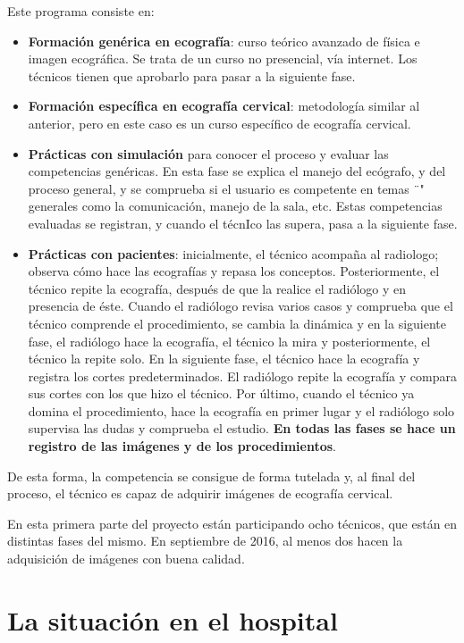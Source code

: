 \documentclass[]{article}
\providecommand{\tightlist}{%
  \setlength{\itemsep}{0pt}\setlength{\parskip}{0pt}}
\begin{document}
Este programa consiste en:

\begin{itemize}
\tightlist
\item
  \textbf{Formación genérica en ecografía}: curso teórico avanzado de física e imagen ecográfica. Se trata de un curso no presencial, vía internet. Los técnicos tienen que aprobarlo para pasar a la siguiente fase.
\item
  \textbf{Formación específica en ecografía cervical}: metodología similar al anterior, pero en este caso es un curso específico de ecografía cervical.
\item
  \textbf{Prácticas con simulación} para conocer el proceso y evaluar las competencias genéricas. En esta fase se explica el manejo del ecógrafo, y del proceso general, y se comprueba si el usuario es competente en temas ¨" generales como la comunicación, manejo de la sala, etc. Estas competencias evaluadas se registran, y cuando el técnIco las supera, pasa a la siguiente fase.
\item
  \textbf{Prácticas con pacientes}: inicialmente, el técnico acompaña al radiologo; observa cómo hace las ecografías y repasa los conceptos. Posteriormente, el técnico repite la ecografía, después de que la realice el radiólogo y en presencia de éste. Cuando el radiólogo revisa varios casos y comprueba que el técnico comprende el procedimiento, se cambia la dinámica y en la siguiente fase, el radiólogo hace la ecografía, el técnico la mira y posteriormente, el técnico la repite solo. En la siguiente fase, el técnico hace la ecografía y registra los cortes predeterminados. El radiólogo repite la ecografía y compara sus cortes con los que hizo el técnico. Por último, cuando el técnico ya domina el procedimiento, hace la ecografía en primer lugar y el radiólogo solo supervisa las dudas y comprueba el estudio. \textbf{En todas las fases se hace un registro de las imágenes y de los procedimientos}.
\end{itemize}

De esta forma, la competencia se consigue de forma tutelada y, al final del proceso, el técnico es capaz de adquirir imágenes de ecografía cervical.

En esta primera parte del proyecto están participando ocho técnicos, que están en distintas fases del mismo. En septiembre de 2016, al menos dos hacen la adquisición de imágenes con buena calidad.

\hypertarget{la-situacion-en-el-hospital}{%
\section{La situación en el hospital}\label{la-situacion-en-el-hospital}}
\end{document}
